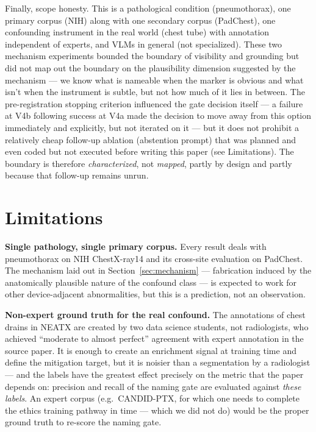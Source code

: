 \documentclass{ieeeaccess}
\begin{document}
Finally, scope honesty. This is a pathological condition (pneumothorax), one primary corpus (NIH) along with one secondary corpus (PadChest), one confounding instrument in the real world (chest tube) with annotation independent of experts, and VLMs in general (not specialized). These two mechanism experiments bounded the boundary of visibility and grounding but did not map out the boundary on the plausibility dimension suggested by the mechanism --- we know what is nameable when the marker is obvious and what isn’t when the instrument is subtle, but not how much of it lies in between. The pre-registration stopping criterion influenced the gate decision itself --- a failure at V4b following success at V4a made the decision to move away from this option immediately and explicitly, but not iterated on it --- but it does not prohibit a relatively cheap follow-up ablation (abstention prompt) that was planned and even coded but not executed before writing this paper (see Limitations). The boundary is therefore \emph{characterized}, not \emph{mapped}, partly by design and partly because that follow-up remains unrun.

\section{Limitations}
\label{sec:limitations}
\textbf{Single pathology, single primary corpus.} Every result deals with pneumothorax on NIH ChestX-ray14 and its cross-site evaluation on PadChest. The mechanism laid out in Section~\ref{sec:mechanism} --- fabrication induced by the anatomically plausible nature of the confound class --- is expected to work for other device-adjacent abnormalities, but this is a prediction, not an observation.

\textbf{Non-expert ground truth for the real confound.} The annotations of chest drains in NEATX are created by two data science students, not radiologists, who achieved ``moderate to almost perfect'' agreement with expert annotation in the source paper. It is enough to create an enrichment signal at training time and define the mitigation target, but it is noisier than a segmentation by a radiologist --- and the labels have the greatest effect precisely on the metric that the paper depends on: precision and recall of the naming gate are evaluated against \emph{these labels}. An expert corpus (e.g.\ CANDID-PTX, for which one needs to complete the ethics training pathway in time --- which we did not do) would be the proper ground truth to re-score the naming gate.
\end{document}
